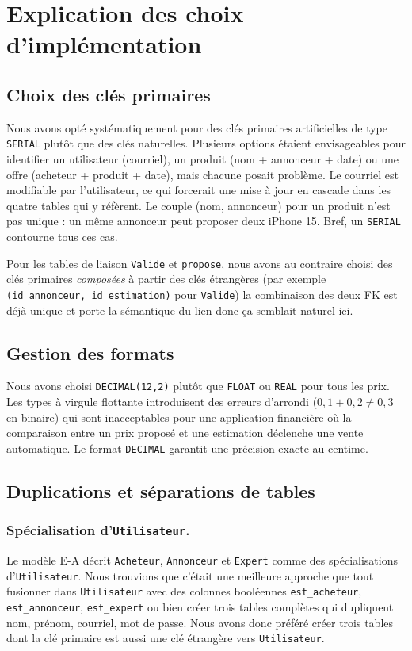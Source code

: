 \documentclass{article}
\theoremstyle{plain}
\theoremstyle{definition}
\begin{document}
\section*{Explication des choix d'implémentation}
 
\subsection*{Choix des clés primaires}
 
Nous avons opté systématiquement pour des clés primaires artificielles
de type \texttt{SERIAL} plutôt que des clés naturelles. Plusieurs options
étaient envisageables pour identifier un utilisateur (courriel), un
produit (nom + annonceur + date) ou une offre (acheteur + produit +
date), mais chacune posait problème. Le courriel est modifiable par
l'utilisateur, ce qui forcerait une mise à jour en cascade dans les
quatre tables qui y réfèrent. Le couple (nom, annonceur) pour un produit
n'est pas unique : un même annonceur peut proposer deux iPhone 15. Bref, un
\texttt{SERIAL} contourne tous ces cas.
 
Pour les tables de liaison \texttt{Valide} et \texttt{propose}, nous
avons au contraire choisi des clés primaires \emph{composées} à partir
des clés étrangères (par exemple \texttt{(id\_annonceur, id\_estimation)}
pour \texttt{Valide}) la combinaison des deux FK est déjà unique
et porte la sémantique du lien donc ça semblait naturel ici.
 
\subsection*{Gestion des formats}
Nous avons choisi \texttt{DECIMAL(12,2)} plutôt
que \texttt{FLOAT} ou \texttt{REAL} pour tous les prix. Les types à
virgule flottante introduisent des erreurs d'arrondi
($0{,}1 + 0{,}2 \neq 0{,}3$ en binaire) qui sont inacceptables pour une
application financière où la comparaison entre un prix proposé et une
estimation déclenche une vente automatique. Le format \texttt{DECIMAL}
garantit une précision exacte au centime.
 
\subsection*{Duplications et séparations de tables}

\subsubsection*{Spécialisation d'\texttt{Utilisateur}.} 
Le modèle E-A décrit
\texttt{Acheteur}, \texttt{Annonceur} et \texttt{Expert} comme des
spécialisations d'\texttt{Utilisateur}. Nous trouvions que c'était une meilleure approche que tout fusionner dans \texttt{Utilisateur} avec des
colonnes booléennes \texttt{est\_acheteur}, \texttt{est\_annonceur},
\texttt{est\_expert} ou bien créer trois tables complètes qui dupliquent
nom, prénom, courriel, mot de passe. Nous avons donc préféré créer trois tables dont la
clé primaire est aussi une clé étrangère vers \texttt{Utilisateur}.
 
\end{document}
